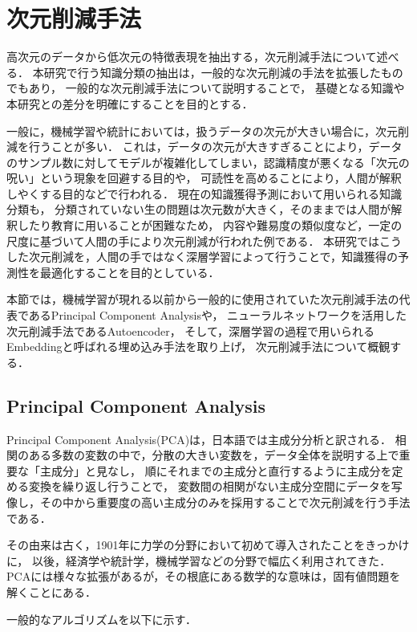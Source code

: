 \section{次元削減手法}
高次元のデータから低次元の特徴表現を抽出する，次元削減手法について述べる．
本研究で行う知識分類の抽出は，一般的な次元削減の手法を拡張したものでもあり，
一般的な次元削減手法について説明することで，
基礎となる知識や本研究との差分を明確にすることを目的とする．


一般に，機械学習や統計においては，扱うデータの次元が大きい場合に，次元削減を行うことが多い．
これは，データの次元が大きすぎることにより，データのサンプル数に対してモデルが複雑化してしまい，認識精度が悪くなる「次元の呪い」\cite{bellman1957dynamic,friedman1997bias}という現象を回避する目的や，
可読性を高めることにより，人間が解釈しやくする目的などで行われる．
現在の知識獲得予測において用いられる知識分類も，
分類されていない生の問題は次元数が大きく，そのままでは人間が解釈したり教育に用いることが困難なため，
内容や難易度の類似度など，一定の尺度に基づいて人間の手により次元削減が行われた例である．
本研究ではこうした次元削減を，人間の手ではなく深層学習によって行うことで，知識獲得の予測性を最適化することを目的としている．

本節では，機械学習が現れる以前から一般的に使用されていた次元削減手法の代表であるPrincipal Component Analysisや，
ニューラルネットワークを活用した次元削減手法であるAutoencoder，
そして，深層学習の過程で用いられるEmbeddingと呼ばれる埋め込み手法を取り上げ，
次元削減手法について概観する．

\subsection{Principal Component Analysis}
Principal Component Analysis(PCA)は，日本語では主成分分析と訳される．
相関のある多数の変数の中で，分散の大きい変数を，データ全体を説明する上で重要な「主成分」と見なし，
順にそれまでの主成分と直行するように主成分を定める変換を繰り返し行うことで，
変数間の相関がない主成分空間にデータを写像し，その中から重要度の高い主成分のみを採用することで次元削減を行う手法である．

その由来は古く，1901年に力学の分野において初めて導入された\cite{pearson1901liii}ことをきっかけに，
以後，経済学や統計学，機械学習などの分野で幅広く利用されてきた\cite{wold1987principal,ku1995disturbance}．
PCAには様々な拡張がある\cite{scholkopf1997kernel,tipping1999probabilistic}が，その根底にある数学的な意味は，固有値問題を解くことにある．

一般的なアルゴリズムを以下に示す．

